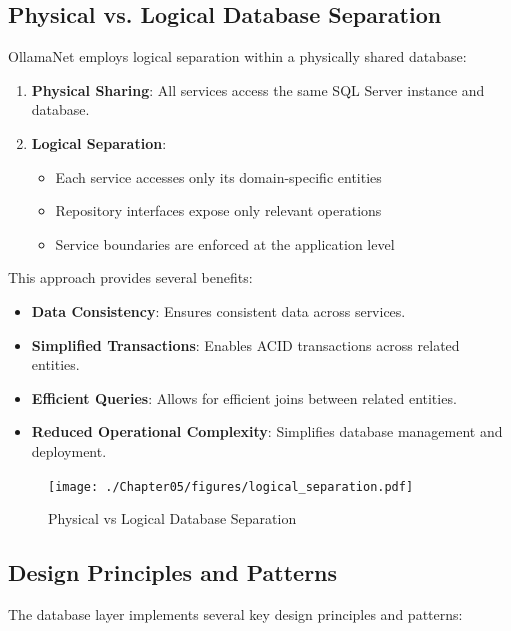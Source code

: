 \subsection{Physical vs. Logical Database Separation}

OllamaNet employs logical separation within a physically shared database:

\begin{enumerate}
   \item \textbf{Physical Sharing}: All services access the same SQL Server instance and database.

   \item \textbf{Logical Separation}:
   \begin{itemize}
      \item Each service accesses only its domain-specific entities
      \item Repository interfaces expose only relevant operations
      \item Service boundaries are enforced at the application level
   \end{itemize}
\end{enumerate}

This approach provides several benefits:

\begin{itemize}
   \item \textbf{Data Consistency}: Ensures consistent data across services.
   \item \textbf{Simplified Transactions}: Enables ACID transactions across related entities.
   \item \textbf{Efficient Queries}: Allows for efficient joins between related entities.
   \item \textbf{Reduced Operational Complexity}: Simplifies database management and deployment.
\end{itemize}

\begin{figure}
    \centering
    \texttt{[image: ./Chapter05/figures/logical\_separation.pdf]}
    \caption{Physical vs Logical Database Separation}
    \label{fig:logical-separation}
\end{figure}
\clearpage

\subsection{Design Principles and Patterns}

The database layer implements several key design principles and patterns:


